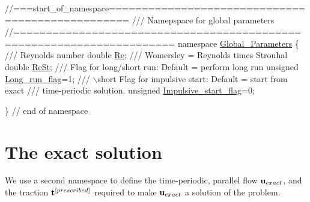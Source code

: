  
\begin{DoxyCodeInclude}
\textcolor{comment}{//===start\_of\_namespace=================================================}
\textcolor{comment}{/// Namepspace for global parameters}
\textcolor{comment}{}\textcolor{comment}{//======================================================================}
\textcolor{keyword}{namespace }\hyperlink{namespaceGlobal__Parameters}{Global\_Parameters}
\{\textcolor{comment}{}
\textcolor{comment}{ /// Reynolds number}
\textcolor{comment}{} \textcolor{keywordtype}{double} \hyperlink{namespaceGlobal__Parameters_a9d72e94a9305c6a310940a6a427ebe06}{Re};
\textcolor{comment}{}
\textcolor{comment}{ /// Womersley = Reynolds times Strouhal}
\textcolor{comment}{} \textcolor{keywordtype}{double} \hyperlink{namespaceGlobal__Parameters_a7a59a32365e87566069e458dc83bd18a}{ReSt};
\textcolor{comment}{}
\textcolor{comment}{ /// Flag for long/short run: Default =  perform long run}
\textcolor{comment}{} \textcolor{keywordtype}{unsigned} \hyperlink{namespaceGlobal__Parameters_a457472b8222bb6bb0d97b2aed78d1ef4}{Long\_run\_flag}=1;
\textcolor{comment}{}
\textcolor{comment}{ /// \(\backslash\)short Flag for impulsive start: Default = start from exact}
\textcolor{comment}{ /// time-periodic solution. }
\textcolor{comment}{} \textcolor{keywordtype}{unsigned} \hyperlink{namespaceGlobal__Parameters_aec41eb8da4929003e5d78ef4b43c0ed9}{Impulsive\_start\_flag}=0;

\} \textcolor{comment}{// end of namespace}

\end{DoxyCodeInclude}




 

\hypertarget{index_exact}{}\section{The exact solution}\label{index_exact}
We use a second namespace to define the time-\/periodic, parallel flow $ {\bf u}_{exact}$, and the traction $ {\bf t}^{[prescribed]}$ required to make $ {\bf u}_{exact}$ a solution of the problem.

